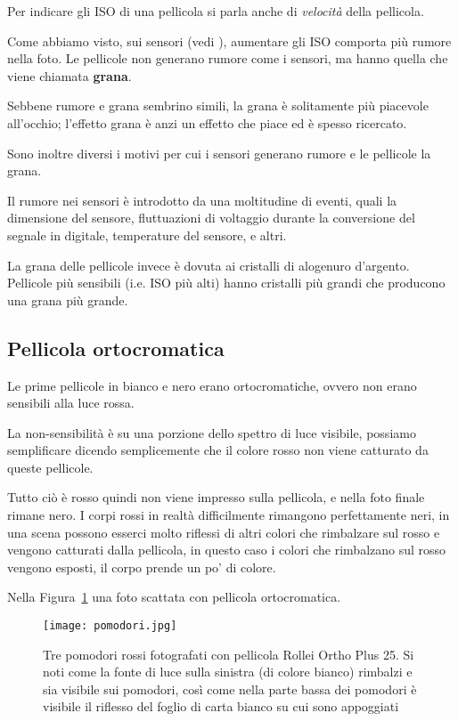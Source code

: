 Per indicare gli ISO di una pellicola si parla anche di \textit{velocità} della pellicola.

Come abbiamo visto, sui sensori (vedi ), aumentare gli ISO comporta più rumore nella foto.
Le pellicole non generano rumore come i sensori, ma hanno quella che viene chiamata \textbf{grana}.

Sebbene rumore e grana sembrino simili, la grana è solitamente più piacevole all'occhio; l'effetto grana è anzi un effetto che piace ed è spesso ricercato.

Sono inoltre diversi i motivi per cui i sensori generano rumore e le pellicole la grana.

Il rumore nei sensori è introdotto da una moltitudine di eventi, quali la dimensione del sensore, fluttuazioni di voltaggio durante la conversione del segnale in digitale, temperature del sensore, e altri.

La grana delle pellicole invece è dovuta ai cristalli di alogenuro d'argento. Pellicole più sensibili (i.e. ISO più alti) hanno cristalli più grandi che producono una grana più grande.


\subsection{Pellicola ortocromatica} \label{subsec:pellicolaorto}
Le prime pellicole in bianco e nero erano ortocromatiche, ovvero non erano sensibili alla luce rossa.

La non-sensibilità è su una porzione dello spettro di luce visibile, possiamo semplificare dicendo semplicemente che il colore rosso non viene catturato da queste pellicole.

Tutto ciò è rosso quindi non viene impresso sulla pellicola, e nella foto finale rimane nero.
I corpi rossi in realtà difficilmente rimangono perfettamente neri, in una scena possono esserci molto riflessi di altri colori che rimbalzare sul rosso e vengono catturati dalla pellicola, in questo caso i colori che rimbalzano sul rosso vengono esposti, il corpo prende un po' di colore.

Nella Figura~\ref{fig:orto} una foto scattata con pellicola ortocromatica.

\begin{figure}[H]
    \centering
    \texttt{[image: pomodori.jpg]}
    \caption{
        Tre pomodori rossi fotografati con pellicola Rollei Ortho Plus 25. Si noti come la fonte di luce sulla sinistra (di colore bianco) rimbalzi e sia visibile sui pomodori, così come nella parte bassa dei pomodori è visibile il riflesso del foglio di carta bianco su cui sono appoggiati
    }
    \label{fig:orto}
\end{figure}

